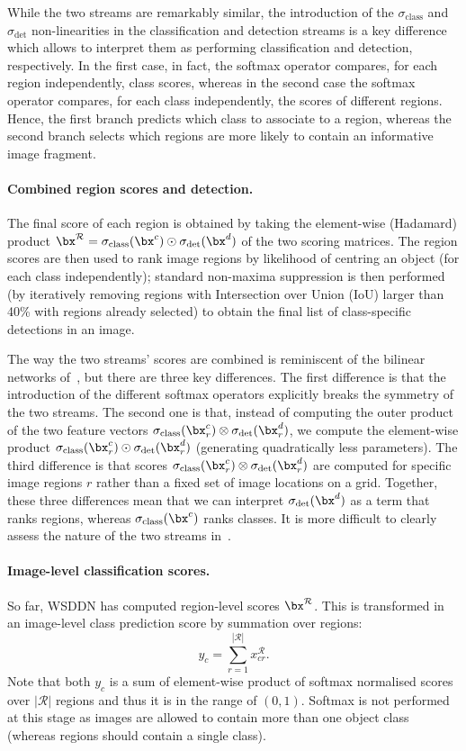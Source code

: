 While the two streams are remarkably similar, the introduction of the $\sigma_\text{class}$ and $\sigma_\text{det}$ non-linearities in the classification and detection streams is a key difference which allows to interpret them as performing classification and detection, respectively. In the first case, in fact, the softmax operator compares, for each region independently, class scores, whereas in the second case the softmax operator compares, for each class independently, the scores of different regions. Hence, the first branch predicts which class to associate to a region, whereas the second branch selects which regions are more likely to contain an informative image fragment.

\paragraph{Combined region scores and detection.} The final score of each region is obtained by taking the element-wise (Hadamard) product $\bx^\mathcal{R} = \sigma_\text{class}(\bx^c) \odot \sigma_\text{det}(\bx^d)$ of the two scoring matrices. The region scores are then used to rank image regions by likelihood of centring an object (for each class independently); standard non-maxima suppression is then performed (by iteratively removing regions with Intersection over Union (IoU) larger than 40\% with regions already selected) to obtain the final list of class-specific detections in an image.

The way the two streams' scores are combined is reminiscent of the bilinear networks of~\cite{Lin15}, but there are three key differences. The first difference is that the introduction of the different softmax operators explicitly breaks the symmetry of the two streams. The second one is that, instead of computing the outer product of the two feature vectors $\sigma_\text{class}(\bx^c_r) \otimes \sigma_\text{det}(\bx^d_r)$, we compute the element-wise product $\sigma_\text{class}(\bx^c_r) \odot \sigma_\text{det}(\bx^d_r)$ (generating quadratically less parameters). The third difference is that scores $\sigma_\text{class}(\bx^c_r) \otimes \sigma_\text{det}(\bx^d_r)$ are computed for specific image regions $r$ rather than a fixed set of image locations on a grid. Together, these three differences mean that we can interpret $\sigma_\text{det}(\bx^d)$ as a term that ranks regions, whereas $\sigma_\text{class}(\bx^c)$ ranks classes. It is more difficult to clearly assess the nature of the two streams in~\cite{Lin15}.

\paragraph{Image-level classification scores.} So far, WSDDN has computed region-level scores $\bx^\mathcal{R}$. This is transformed in an image-level class prediction score by summation over regions:
\[
   y_c = \sum_{r=1}^{|\mathcal{R}|} x^{\mathcal{R}}_{cr}.
\] 
Note that both $y_c$ is a sum of element-wise product of softmax normalised scores over $|\mathcal{R}|$ regions and thus it is in the range of $(0,1)$. Softmax is not performed at this stage as images are allowed to contain more than one object class (whereas regions should contain a single class).

